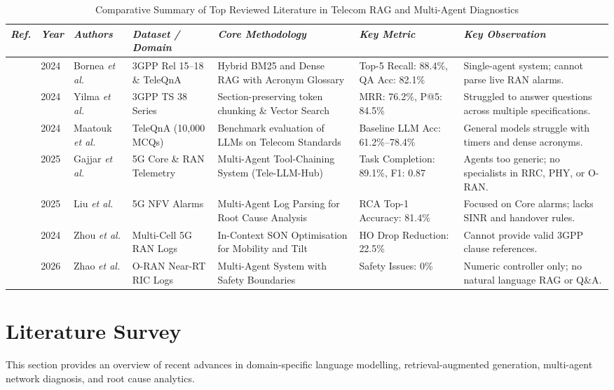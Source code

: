 \documentclass[conference]{IEEEtran}
\begin{document}
\begin{table}[t]
\centering
\caption{Comparative Summary of Top Reviewed Literature in Telecom RAG and Multi-Agent Diagnostics}
\label{tab:lit_survey}
\renewcommand{\arraystretch}{1.22}
\begin{tabular}{p{0.8cm} p{0.7cm} p{1.8cm} p{2.6cm} p{3.6cm} p{2.7cm} p{3.4cm}}
\toprule
\textit{Ref.} & \textit{Year} & \textit{Authors} & \textit{Dataset / Domain} & \textit{Core Methodology} & \textit{Key Metric} & \textit{Key Observation} \\
\midrule
\cite{bornea2024} & 2024 & Bornea \textit{et al.} & 3GPP Rel 15--18 \& TeleQnA & Hybrid BM25 and Dense RAG with Acronym Glossary & Top-5 Recall: 88.4\%, QA Acc: 82.1\% & Single-agent system; cannot parse live RAN alarms. \\
\cite{yilma2024} & 2024 & Yilma \textit{et al.} & 3GPP TS 38 Series & Section-preserving token chunking \& Vector Search & MRR: 76.2\%, P@5: 84.5\% & Struggled to answer questions across multiple specifications. \\
\cite{maatouk2024} & 2024 & Maatouk \textit{et al.} & TeleQnA (10,000 MCQs) & Benchmark evaluation of LLMs on Telecom Standards & Baseline LLM Acc: 61.2\%--78.4\% & General models struggle with timers and dense acronyms. \\
\cite{gajjar2025} & 2025 & Gajjar \textit{et al.} & 5G Core \& RAN Telemetry & Multi-Agent Tool-Chaining System (Tele-LLM-Hub) & Task Completion: 89.1\%, F1: 0.87 & Agents too generic; no specialists in RRC, PHY, or O-RAN. \\
\cite{liu2025} & 2025 & Liu \textit{et al.} & 5G NFV Alarms & Multi-Agent Log Parsing for Root Cause Analysis & RCA Top-1 Accuracy: 81.4\% & Focused on Core alarms; lacks SINR and handover rules. \\
\cite{zhou2024} & 2024 & Zhou \textit{et al.} & Multi-Cell 5G RAN Logs & In-Context SON Optimisation for Mobility and Tilt & HO Drop Reduction: 22.5\% & Cannot provide valid 3GPP clause references. \\
\cite{zhao2026} & 2026 & Zhao \textit{et al.} & O-RAN Near-RT RIC Logs & Multi-Agent System with Safety Boundaries & Safety Issues: 0\% & Numeric controller only; no natural language RAG or Q\&A. \\
\bottomrule
\end{tabular}
\end{table}

\section{Literature Survey}
This section provides an overview of recent advances in domain-specific language modelling, retrieval-augmented generation, multi-agent network diagnosis, and root cause analytics.
\end{document}
